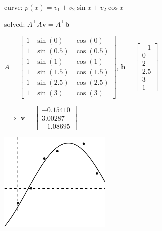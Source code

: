 \documentclass[12pt]{amsart}
\newcommand{\bb}{\mathbf{b}}
\newcommand{\bv}{\mathbf{v}}
\newcommand{\ds}{\displaystyle}
\begin{document}
\msni curve: $p(x) = v_1 + v_2 \sin x + v_2 \cos x$

\msni solved: $A^\top A \bv = A^\top \bb$

\msni $\ds A = \begin{bmatrix} 1 & \sin(0) & \cos(0) \\ 1 & \sin(0.5) & \cos(0.5) \\ 1 & \sin(1) & \cos(1) \\ 1 & \sin(1.5) & \cos(1.5) \\ 1 & \sin(2.5) & \cos(2.5) \\ 1 & \sin(3) & \cos(3) \end{bmatrix}$, \quad $\ds \bb = \begin{bmatrix} -1 \\ 0 \\ 2 \\ 2.5 \\ 3 \\ 1 \end{bmatrix}$

\msni $\implies$ \quad $\ds \bv = \begin{bmatrix} -0.15410 \\ 3.00287 \\ -1.08695 \end{bmatrix}$

\vspace{-60mm}
\hfill \includegraphics[width=0.4\textwidth]{figs/mar21fig4.pdf}
\vfill
\end{document}
